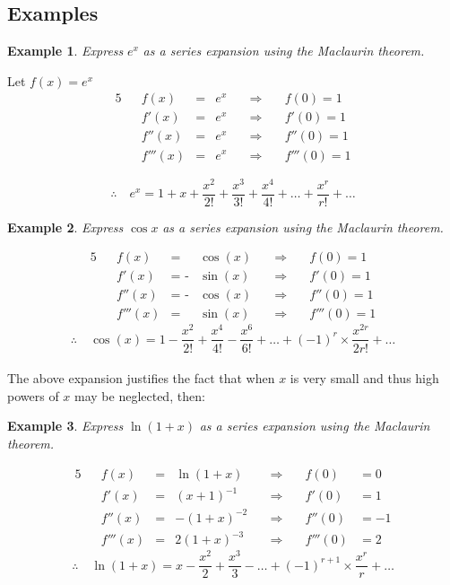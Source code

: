 \documentclass[12pt, a4paper]{report}
\theoremstyle{definition}
\newtheorem{example}{Example}
\begin{document}
	\subsection{Examples}
	\begin{example}
		\emph{Express} $e^x$ \emph{as a series expansion using the Maclaurin theorem.}
	\end{example}
	Let $f(x) = e^x$
	\begin{alignat*}{5}
		&   & f(x)    & = & e^x \quad & \Rightarrow\quad & f(0) = 1    \\
		&   & f'(x)   & = & e^x \quad & \Rightarrow\quad & f'(0) = 1   \\
		&   & f''(x)  & = & e^x \quad & \Rightarrow\quad & f''(0) = 1  \\
		&   & f'''(x) & = & e^x \quad & \Rightarrow\quad & f'''(0) = 1 
	\end{alignat*}
	
	$$\therefore \quad e^x  = 1 + x + \frac{x^2}{2!} + \frac{x^3}{3!} + \frac{x^4}{4!} +\ldots + \frac{x^r}{r!} + \ldots $$
	\hrulefill
	\begin{example}
		\emph{Express} $\cos x$ \emph{as a series expansion using the Maclaurin theorem.}
	\end{example}
	\begin{alignat*}{5}
		&   & f(x)    & =           & \cos (x) \quad & \Rightarrow\quad & f(0) = 1    \\
		&   & f'(x)   & = \text{ -} & \sin (x) \quad & \Rightarrow\quad & f'(0) = 1   \\
		&   & f''(x)  & = \text{ -} & \cos(x) \quad  & \Rightarrow\quad & f''(0) = 1  \\
		&   & f'''(x) & =           & \sin (x) \quad & \Rightarrow\quad & f'''(0) = 1 
	\end{alignat*}
	$$\therefore \quad \cos (x)  = 1 - \frac{x^2}{2!} + \frac{x^4}{4!} -\frac{x^6}{6!}+\ldots + (-1)^r\times\frac{x^{2r}}{2r!} + \ldots $$\\
	The above expansion justifies the fact that when $x$ is very small and thus high powers of $x$ may be neglected, then: \\
	\begin{example}
		\emph{Express} $\ln(1+x)$ \emph{as a series expansion using the Maclaurin theorem.}
	\end{example}
	
	\begin{alignat*}{5}
		&   & f(x)    & = & \ln(1+x)      \quad & \Rightarrow  \quad & f(0)    & = 0  \\
		&   & f'(x)   & = & (x+1)^{-1} \quad    & \Rightarrow  \quad & f'(0)   & = 1  \\
		&   & f''(x)  & = & -(1+x)^{-2}  \quad  & \Rightarrow \quad  & f''(0)  & = -1 \\
		&   & f'''(x) & = & 2(1+x)^{-3} \quad   & \Rightarrow  \quad & f'''(0) & = 2  
	\end{alignat*}
	$$\therefore \quad \ln(1+x)  = x - \frac{x^2}{2} + \frac{x^3}{3} - \ldots + (-1)^{r+1}\times\frac{x^r}{r} + \ldots $$\\
	\hrulefill
	
\end{document}
